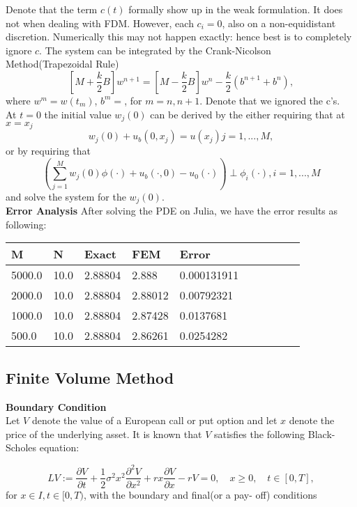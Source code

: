 \documentclass{article}
\begin{document}
Denote that the term $c(t)$ formally show up in the weak formulation. It does not when dealing with FDM. However, each $c_i = 0$, also on a non-equidistant discretion. Numerically this may not happen exactly: hence best is to completely ignore $c$.
The system can be integrated by the Crank-Nicolson Method(Trapezoidal Rule)
$$
[M+\frac{k}{2}B]w^{n+1} = [M-\frac{k}{2}B]w^n  - \frac{k}{2}(b^{n+1}+b^n),
$$
where $w^m = w(t_m)$, $b^m =$, for $m = n, n+1$. Denote that we ignored the c's.\\
At $t=0$ the initial value $w_j(0)$ can be derived by the either requiring that at $x= x_j$
$$
w_j(0) + u_b(0,x_j) = u(x_j) j =1,...,M,
$$
or by requiring that
$$
(\sum_{j=1}^M w_j(0)\phi(\cdot)+u_b(\cdot,0)-u_0(\cdot))\perp \phi_i(\cdot), i = 1, ..., M
$$
and solve the system for the $w_j(0)$.\\
\textbf{Error Analysis}
After solving the PDE on Julia, we have the error results as following:
\begin{table}[!ht]
    \centering
    \begin{tabular}{|l|l|l|l|l|l|l|l|l|l|}
    \hline
        M & N & Exact  & FEM & Error \\ \hline
        5000.0 & 10.0 & 2.88804 & 2.888 & 0.000131911  \\ \hline
        2000.0 & 10.0 & 2.88804 & 2.88012 & 0.00792321 \\ \hline
        1000.0 & 10.0 & 2.88804 & 2.87428 & 0.0137681 \\ \hline
        500.0 & 10.0 & 2.88804 & 2.86261 & 0.0254282  \\ \hline
    \end{tabular}
\end{table}






 
\subsection{Finite Volume Method}
\textbf{Boundary Condition}\\
Let $V$ denote the value of a European call or put option and let $x$ denote the price of the underlying asset. It is known that $V$ satisfies the following Black-Scholes equation:

$$LV:=\frac{\partial V}{\partial t} + \frac{1}{2}\sigma^2x^2\frac{\partial^2 V}{\partial x^2} + rx\frac{\partial V}{\partial x} - rV = 0, \quad x\geq0,\quad t \in [0, T],$$
for $x \in I, t \in [0, T)$, with the boundary and final(or a pay- off) conditions
\end{document}
